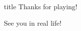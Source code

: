 \documentclass[11pt]{beamer}
\begin{document}
\subsection*{\ }
\begingroup{}
\begin{frame}
\vfill{}
\centering{}
\begin{beamercolorbox}[sep=8pt,center,shadow=true,rounded=true]{title}
Thanks for playing!\par%
See you in real life!
\end{beamercolorbox}
\vfill{}
\end{frame}
\endgroup{}
\end{document}
